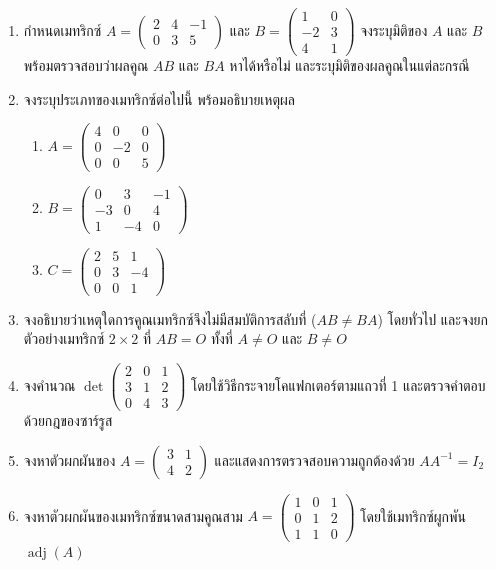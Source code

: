 \newpage
\QAChapter
\begin{enumerate}
    \item กำหนดเมทริกซ์ $A = \begin{pmatrix} 2 & 4 & -1 \\ 0 & 3 & 5 \end{pmatrix}$ และ $B = \begin{pmatrix} 1 & 0 \\ -2 & 3 \\ 4 & 1 \end{pmatrix}$ จงระบุมิติของ $A$ และ $B$ พร้อมตรวจสอบว่าผลคูณ $AB$ และ $BA$ หาได้หรือไม่ และระบุมิติของผลคูณในแต่ละกรณี
    \item จงระบุประเภทของเมทริกซ์ต่อไปนี้ พร้อมอธิบายเหตุผล
    \begin{enumerate}
        \item $A = \begin{pmatrix} 4 & 0 & 0 \\ 0 & -2 & 0 \\ 0 & 0 & 5 \end{pmatrix}$
        \item $B = \begin{pmatrix} 0 & 3 & -1 \\ -3 & 0 & 4 \\ 1 & -4 & 0 \end{pmatrix}$
        \item $C = \begin{pmatrix} 2 & 5 & 1 \\ 0 & 3 & -4 \\ 0 & 0 & 1 \end{pmatrix}$
    \end{enumerate}
    \item จงอธิบายว่าเหตุใดการคูณเมทริกซ์จึงไม่มีสมบัติการสลับที่ ($AB \neq BA$) โดยทั่วไป และจงยกตัวอย่างเมทริกซ์ $2 \times 2$ ที่ $AB = O$ ทั้งที่ $A \neq O$ และ $B \neq O$
    \item จงคำนวณ $\det\begin{pmatrix} 2 & 0 & 1 \\ 3 & 1 & 2 \\ 0 & 4 & 3 \end{pmatrix}$ โดยใช้วิธีกระจายโคแฟกเตอร์ตามแถวที่ 1 และตรวจคำตอบด้วยกฎของซาร์รูส
    \item จงหาตัวผกผันของ $A = \begin{pmatrix} 3 & 1 \\ 4 & 2 \end{pmatrix}$ และแสดงการตรวจสอบความถูกต้องด้วย $A A^{-1} = I_2$
    \item จงหาตัวผกผันของเมทริกซ์ขนาดสามคูณสาม $A = \begin{pmatrix} 1 & 0 & 1 \\ 0 & 1 & 2 \\ 1 & 1 & 0 \end{pmatrix}$ โดยใช้เมทริกซ์ผูกพัน $\operatorname{adj}(A)$

\end{enumerate}
